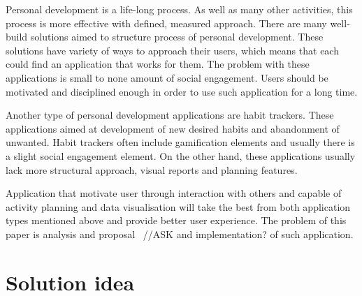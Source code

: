 Personal development is a life-long process.
As well as many other activities, this process is more effective with defined, measured approach.
There are many well-build solutions aimed to structure process of personal development.
These solutions have variety of ways to approach their users, which means that each could find an application that works for them.
The problem with these applications is small to none amount of social engagement.
Users should be motivated and disciplined enough in order to use such application for a long time.

Another type of personal development applications are habit trackers.
These applications aimed at development of new desired habits and abandonment of unwanted.
Habit trackers often include gamification elements and usually there is a slight social engagement element.
On the other hand, these applications usually lack more structural approach, visual reports and planning features.

Application that motivate user through interaction with others and capable of activity planning and data visualisation
will take the best from both application types mentioned above and provide better user experience.
The problem of this paper is analysis and proposal ~{\color{gray}//ASK and implementation?} of such application.

\section{Solution idea}\label{sec:solution-idea}
